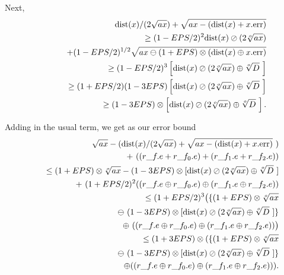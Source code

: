 Next,
\begin{eqnarray*}
&&{\rm dist}(x)/(2 \sqrt {ax}) + \sqrt {ax - ({\rm dist}(x) + x.{\rm err})}\\
&&\quad 
\ge  (1 - EPS/2)^2 {\rm dist}(x) \oslash (2 \root o \of {ax}) 
\\
&&\qquad + (1 - EPS/2)^{1/2}\sqrt {ax \ominus (1+EPS) \otimes ({\rm dist}(x) \oplus x.{\rm err})}
                                              \\
&&\quad \ge(1 - EPS/2)^3 \left[{\rm dist}(x) \oslash (2 \root o \of {ax}) \oplus \root o \of {D}\
\right]\\
&&\quad \ge (1 + EPS/2) (1 - 3EPS) \left[{\rm dist}(x) \oslash (2 \root o \of {ax}) \oplus \root o \of {D}\ \right]\\
&&\quad \ge (1 -
3EPS) \otimes \left[{\rm dist}(x) \oslash (2 \root o \of {ax}) \oplus \root o \of {D}\ \right].
\end{eqnarray*}

Adding in the usual term, we get as our error bound
\begin{eqnarray*}
&&\sqrt {ax} - ({\rm dist}(x)/(2 \sqrt {ax}) + \sqrt {ax - ({\rm dist}(x) + x.{\rm err})}\ )\\
&&\qquad+\ ((r\_f.e + r\_f_0.e) + (r\_f_1.e + r\_f_2.e))\\
&&\quad \le (1 + EPS) \otimes \root o \of {ax} 
- (1 - 3EPS) \otimes [{\rm dist}(x) \oslash (2 \root o \of {ax}) \oplus 
\root o \of {D}\ ]
\\
&&\qquad+\ (1 + EPS/2)^2 ((r\_f.e \oplus r\_f_0.e) \oplus (r\_f_1.e \oplus r\_f_2.e))
      \\
&&\quad \le (1 + EPS/2)^3 \big(\{(1 + EPS) \otimes \root o \of {ax} \\
&&\qquad 
\ominus\ (1 - 3EPS) \otimes [{\rm dist}(x) \oslash (2 \root o \of {ax}) \oplus \root o \of {D}\ ]\}
\\
&&\qquad \oplus\ ((r\_f.e \oplus r\_f_0.e) \oplus (r\_f_1.e \oplus r\_f_2.e))\big)
 \\
&&\quad \le (1 + 3EPS) \otimes (
\{(1 + EPS) \otimes \root o \of {ax} 
\\
&&\qquad\ominus\ (1 - 3EPS) \otimes [{\rm dist}(x) \oslash (2 \root o \of {ax})\oplus \root o \of {D}\ ]\}
\\
&&\qquad \oplus ((r\_f.e \oplus r\_f_0.e) \oplus (r\_f_1.e \oplus r\_f_2.e))
                                                ).\\
\noalign{\vskip-36pt}
\end{eqnarray*}
\enddemo


